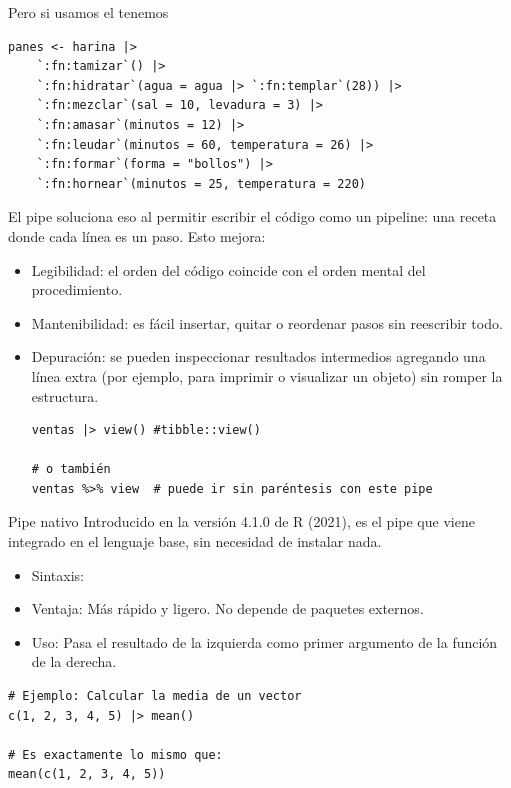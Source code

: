 \documentclass[8pt]{beamer}
\begin{document}
\begin{frame}[fragile]
	Pero si usamos el  tenemos
\begin{lstlisting}[style=RScript]
panes <- harina |>
	`:fn:tamizar`() |>
	`:fn:hidratar`(agua = agua |> `:fn:templar`(28)) |>
	`:fn:mezclar`(sal = 10, levadura = 3) |>
	`:fn:amasar`(minutos = 12) |>
	`:fn:leudar`(minutos = 60, temperatura = 26) |>
	`:fn:formar`(forma = "bollos") |>
	`:fn:hornear`(minutos = 25, temperatura = 220)	
\end{lstlisting}
\end{frame}




\begin{frame}[fragile]
	El pipe soluciona eso al permitir escribir el código como un pipeline: una receta donde cada línea es un paso. Esto mejora:
	
	\begin{itemize}
		\item Legibilidad: el orden del código coincide con el orden mental del procedimiento.
		\item Mantenibilidad: es fácil insertar, quitar o reordenar pasos sin reescribir todo.
		\item Depuración: se pueden inspeccionar resultados intermedios agregando una línea extra (por ejemplo, para imprimir o visualizar un objeto) sin romper la estructura.
\begin{lstlisting}[style=RScript]
ventas |> view() #tibble::view()

# o también
ventas %>% view	 # puede ir sin paréntesis con este pipe
\end{lstlisting}
	\end{itemize}
\end{frame}






\begin{frame}[fragile]{Pipe nativo}
Introducido en la versión 4.1.0 de R (2021), es el pipe que viene integrado en el lenguaje base, sin necesidad de instalar nada.
\begin{itemize}
	\item Sintaxis: \rscript{|>}
	\item Ventaja: Más rápido y ligero. No depende de paquetes externos.
	\item Uso: Pasa el resultado de la izquierda como primer argumento de la función de la derecha.
\end{itemize}

\begin{lstlisting}[style=RScript]
# Ejemplo: Calcular la media de un vector
c(1, 2, 3, 4, 5) |> mean()

# Es exactamente lo mismo que:
mean(c(1, 2, 3, 4, 5))	
\end{lstlisting}
\end{frame}
\end{document}
